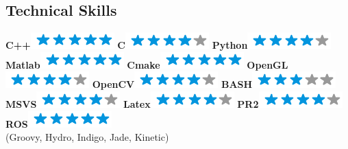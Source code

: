 \documentclass[]{friggeri-cv}
\begin{document}
\begin{aside}
  \section{Technical Skills}
    \textbf{C++}\includegraphics[scale=0.40]{img/5stars.png}
    \textbf{C}\includegraphics[scale=0.40]{img/4stars.png}
    \textbf{Python}\includegraphics[scale=0.40]{img/4stars.png}
    \textbf{Matlab}\includegraphics[scale=0.40]{img/5stars.png}
    \textbf{Cmake}\includegraphics[scale=0.40]{img/5stars.png}
    \textbf{OpenGL}\includegraphics[scale=0.40]{img/4stars.png}
    \textbf{OpenCV}\includegraphics[scale=0.40]{img/4stars.png}
    \textbf{BASH}\includegraphics[scale=0.40]{img/3stars.png}
    \textbf{MSVS}\includegraphics[scale=0.40]{img/4stars.png}
    \textbf{Latex}\includegraphics[scale=0.40]{img/4stars.png}
    \textbf{PR2}\includegraphics[scale=0.40]{img/4stars.png}
    \textbf{ROS}\includegraphics[scale=0.40]{img/5stars.png}\\ \scriptsize{(Groovy, Hydro, Indigo, Jade, Kinetic)}
    ~
\end{aside}
\end{document}
